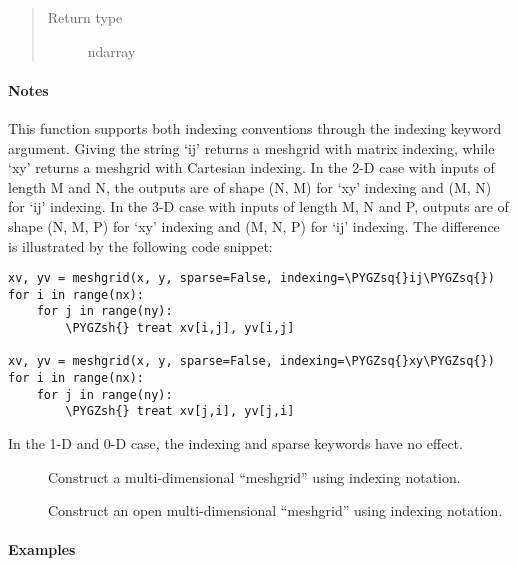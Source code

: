 \documentclass[letterpaper,10pt,english]{sphinxmanual}
\def\PYGZsh{\char`\#}
\def\PYGZsq{\char`\'}
\renewcommand\PYGZsq{\textquotesingle}
\begin{document}
\begin{fulllineitems}
\begin{quote}
\begin{description}
\item[{Return type}] \leavevmode
ndarray

\end{description}\end{quote}
\paragraph{Notes}

This function supports both indexing conventions through the indexing
keyword argument.  Giving the string `ij' returns a meshgrid with
matrix indexing, while `xy' returns a meshgrid with Cartesian indexing.
In the 2-D case with inputs of length M and N, the outputs are of shape
(N, M) for `xy' indexing and (M, N) for `ij' indexing.  In the 3-D case
with inputs of length M, N and P, outputs are of shape (N, M, P) for
`xy' indexing and (M, N, P) for `ij' indexing.  The difference is
illustrated by the following code snippet:

\begin{Verbatim}[commandchars=\\\{\}]
xv, yv = meshgrid(x, y, sparse=False, indexing=\PYGZsq{}ij\PYGZsq{})
for i in range(nx):
    for j in range(ny):
        \PYGZsh{} treat xv[i,j], yv[i,j]

xv, yv = meshgrid(x, y, sparse=False, indexing=\PYGZsq{}xy\PYGZsq{})
for i in range(nx):
    for j in range(ny):
        \PYGZsh{} treat xv[j,i], yv[j,i]
\end{Verbatim}

In the 1-D and 0-D case, the indexing and sparse keywords have no effect.



\begin{description}
\item[{}] \leavevmode
Construct a multi-dimensional ``meshgrid'' using indexing notation.

\item[{}] \leavevmode
Construct an open multi-dimensional ``meshgrid'' using indexing notation.

\end{description}


\paragraph{Examples}


\end{fulllineitems}
\end{document}

